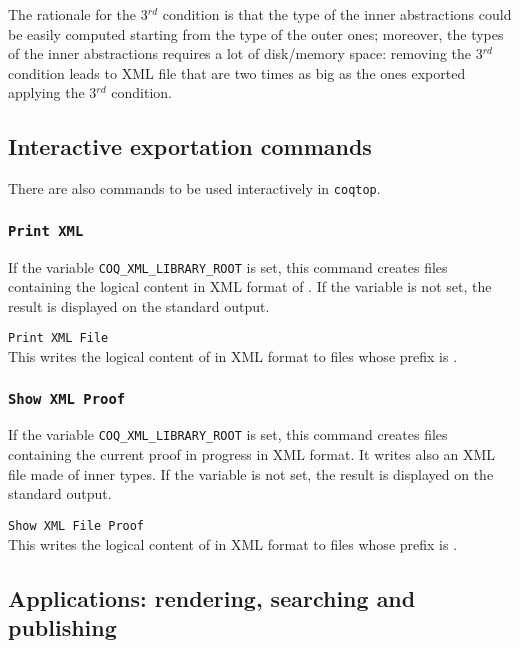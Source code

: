 The rationale for the 3$^{rd}$ condition is that the type of the inner
abstractions could be easily computed starting from the type of the
outer ones; moreover, the types of the inner abstractions requires a
lot of disk/memory space: removing the 3$^{rd}$ condition leads to XML
file that are two times as big as the ones exported applying the 3$^{rd}$
condition.

\subsection{Interactive exportation commands}

There are also commands to be used interactively in {\tt coqtop}.

\subsubsection{\tt Print XML {\qualid}}

If the variable {\tt COQ\_XML\_LIBRARY\_ROOT} is set, this command creates
files containing the logical content in XML format of {\qualid}. If
the variable is not set, the result is displayed on the standard
output.

\begin{Variants}
\item {\tt Print XML File {\str} {\qualid}}\\
This writes the logical content of {\qualid} in XML format to files
whose prefix is {\str}.
\end{Variants}

\subsubsection{{\tt Show XML Proof}}

If the variable {\tt COQ\_XML\_LIBRARY\_ROOT} is set, this command creates
files containing the current proof in progress in XML format. It
writes also an XML file made of inner types.  If the variable is not
set, the result is displayed on the standard output.

\begin{Variants}
\item {\tt Show XML File {\str} Proof}\\ This writes the
logical content of {\qualid} in XML format to files whose prefix is
{\str}. 
\end{Variants}

\subsection{Applications: rendering, searching and publishing}

